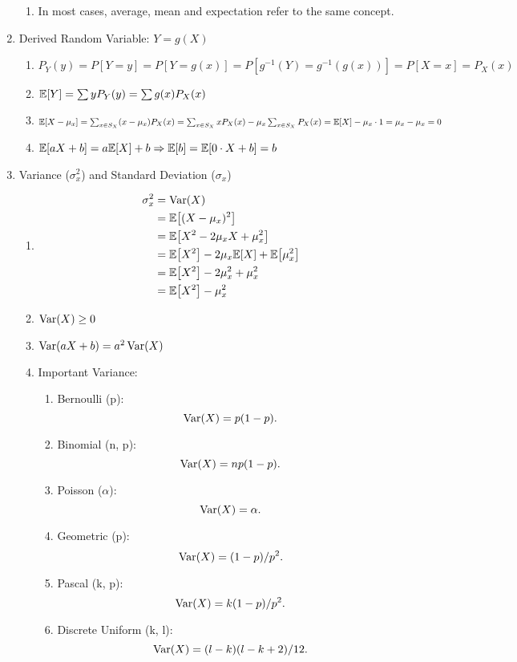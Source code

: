 \begin{enumerate}
{\begin{enumerate}
            \item In most cases, average, mean and expectation refer to the same concept.
        \end{enumerate}
    }
    \item Derived Random Variable: $Y = g(X)${
        \begin{enumerate}
            \item $P_Y(y) = P[Y=y] = P[Y=g(x)] = P[g^{-1}(Y)=g^{-1}(g(x))] = P[X=x] = P_X(x)$
            \item $\E{Y} = \sum yP_Y(y) = \sum g(x)P_X(x)$
            \item $\E{X-\mu_x}=\sum_{x\in S_X}(x-\mu_x)P_X(x)=\sum_{x\in S_X}xP_X(x)-\mu_x\sum_{x\in S_X}P_X(x)=\E{X}-\mu_x\cdot 1=\mu_x-\mu_x=0$
            \item $\E{aX+b}=a\E{X}+b \Rightarrow \E{b}=\E{0\cdot X+b}=b$
        \end{enumerate}
    }
    \item Variance ($\sigma_x^2$) and Standard Deviation ($\sigma_x$){
        \begin{enumerate}
            \item {
                \begin{align*}
                    \sigma_x^2
                    &= \Var(X) \\
                    &= \E{(X-\mu_x)^2} \\
                    &= \E{X^2-2\mu_x X+\mu_x^2} \\
                    &= \E{X^2}-2\mu_x\E{X}+\E{\mu_x^2} \\
                    &= \E{X^2}-2\mu_x^2+\mu_x^2 \\
                    &= \E{X^2}-\mu_x^2
                \end{align*}
            }
            \item $\mathop{\mathrm{Var}}\nolimits(X)\geq 0$
            \item $\mathop{\mathrm{Var}}\nolimits(aX+b)=a^2\mathop{\mathrm{Var}}\nolimits(X)$
            \item Important Variance:{
                \begin{enumerate}
                    \item Bernoulli (p): \[\mathop{\mathrm{Var}}\nolimits(X)=p(1-p).\]
                    \item Binomial (n, p): \[\mathop{\mathrm{Var}}\nolimits(X)=np(1-p).\]
                    \item Poisson ($\alpha$): \[\mathop{\mathrm{Var}}\nolimits(X)=\alpha.\]
                    \item Geometric (p): \[\mathop{\mathrm{Var}}\nolimits(X)=(1-p)/p^2.\]
                    \item Pascal (k, p): \[\mathop{\mathrm{Var}}\nolimits(X)=k(1-p)/p^2.\]
                    \item Discrete Uniform (k, l): \[\mathop{\mathrm{Var}}\nolimits(X)=(l-k)(l-k+2)/12.\]
                \end{enumerate}
            }
        \end{enumerate}
    }
\end{enumerate}
